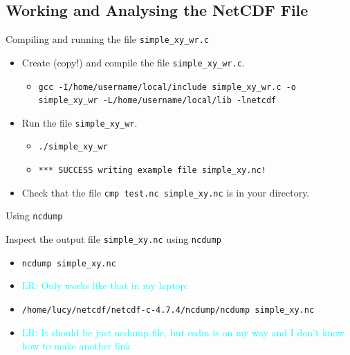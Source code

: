 \documentclass[compress,11pt,xcolor=svgnames,aspectratio=169]{beamer}
\newcommand{\lr}[1]{\textcolor{cyan}{LR: #1}}
\begin{document}
\subsection{Working and Analysing the NetCDF File}

\begin{frame}[fragile]{Compiling and running the file \texttt{simple\_xy\_wr.c}}

\begin{itemize}
\setlength\itemsep{0.6cm}

  \item Create (copy!) and compile the file \verb|simple_xy_wr.c|.

    \begin{itemize}
      \item {\tiny \verb|gcc -I/home/username/local/include simple_xy_wr.c -o simple_xy_wr -L/home/username/local/lib -lnetcdf|}
    \end{itemize}

  \item Run the file \verb|simple_xy_wr|.

      \begin{itemize}
        \item {\tiny  \verb|./simple_xy_wr|}
        \item {\tiny  \verb|*** SUCCESS writing example file simple_xy.nc!|}\\[0.5cm]
      \end{itemize}

  \item Check that the file \verb|cmp test.nc simple_xy.nc| is in your directory.

\end{itemize}

\end{frame}

\begin{frame}[fragile]{Using \texttt{ncdump}}

Inspect the output file \verb|simple_xy.nc| using \verb|ncdump|

\begin{itemize}

  \item \verb|ncdump simple_xy.nc|

  \item \lr{Only works like that in my laptop:}

  \item \verb|/home/lucy/netcdf/netcdf-c-4.7.4/ncdump/ncdump simple_xy.nc|

  \item \lr{It should be just ncdump file, but esdm is on my way and I don’t know how to make another link}

\end{itemize}

\end{frame}
\end{document}
